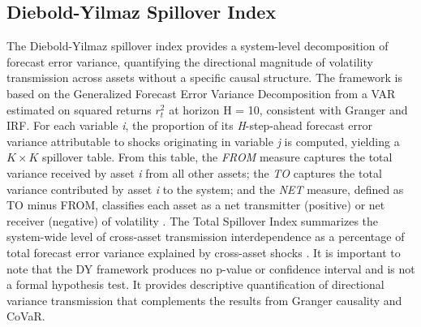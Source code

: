 \documentclass[12pt,a4paper,titlepage,oneside,english]{article}
\begin{document}
\subsection{Diebold-Yilmaz Spillover Index}
The Diebold-Yilmaz spillover index provides a system-level decomposition of forecast error variance, quantifying the directional magnitude of volatility transmission across assets without a specific causal structure. The framework is based on the Generalized Forecast Error Variance Decomposition from a VAR estimated on squared returns $r^2_t$ at horizon H = 10, consistent with Granger and IRF. For each variable \textit{i}, the proportion of its \textit{H}-step-ahead forecast error variance attributable to shocks originating in variable \textit{j} is computed, yielding a $K\times K$ spillover table. From this table, the \textit{FROM} measure captures the total variance received by asset \textit{i} from all other assets; the \textit{TO} captures the total variance contributed by asset \textit{i} to the system; and the \textit{NET} measure,  defined as TO minus FROM, classifies each asset as a net transmitter (positive) or net receiver (negative) of volatility \parencite{DIEBOLD201257}. The Total Spillover Index summarizes the system-wide level of cross-asset transmission interdependence as a percentage of total forecast error variance explained by cross-asset shocks \parencite{DIEBOLD201257}. It is important to note that the DY framework produces no p-value or confidence interval and is not a formal hypothesis test. It provides descriptive quantification of directional variance transmission that complements the results from Granger causality and CoVaR.
\end{document}
